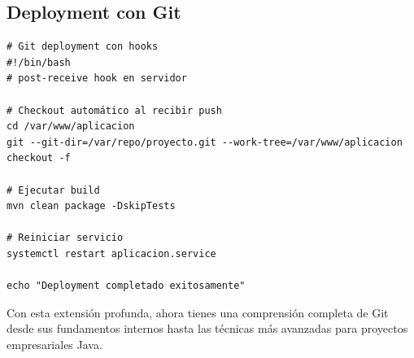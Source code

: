 \documentclass[12pt,a4paper]{article}
\begin{document}
\subsection{Deployment con Git}
\begin{lstlisting}[caption=Estrategias de deployment]
# Git deployment con hooks
#!/bin/bash
# post-receive hook en servidor

# Checkout automático al recibir push
cd /var/www/aplicacion
git --git-dir=/var/repo/proyecto.git --work-tree=/var/www/aplicacion checkout -f

# Ejecutar build
mvn clean package -DskipTests

# Reiniciar servicio
systemctl restart aplicacion.service

echo "Deployment completado exitosamente"
\end{lstlisting}

Con esta extensión profunda, ahora tienes una comprensión completa de Git desde sus fundamentos internos hasta las técnicas más avanzadas para proyectos empresariales Java.
\end{document}
